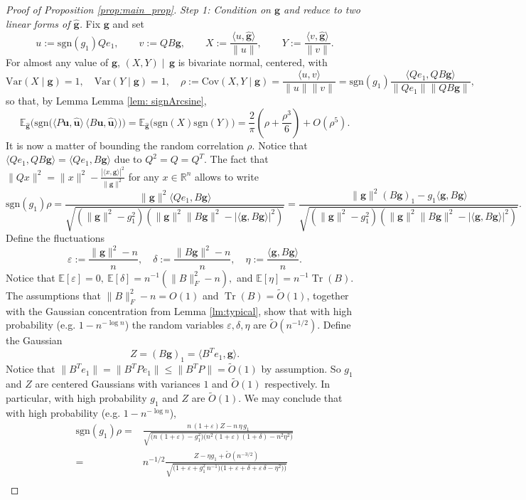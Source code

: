 \documentclass[reqno]{amsart}
\numberwithin{equation}{section}
\newcommand\E{\mathbb{E}}
\newcommand\R{\mathbb{R}}
\newcommand\bg{\bm{g}}
\newcommand\hg{\hat{\bm g}}
\newcommand\rem{\tilde{O}\left(n^{-3/2}\right)}
\newcommand\bu{\bm{u}}
\newcommand\hu{\hat{\bm u}}
\newcommand\eps{\varepsilon}
\newcommand\Tr{{\operatorname{Tr}}}
\newcommand{\Var}{\mathrm{Var}}
\newcommand{\Cov}{\mathrm{Cov}}
\begin{document}
\begin{proof}[Proof of Proposition \ref{prop:main_prop}]
\emph{Step 1: Condition on $\bg$ and reduce to two linear forms of $\hg$.}
Fix $\bg$ and set
\[
u:=\mathrm{sgn}(g_1)Qe_1,\qquad v:=QB\bg, \qquad
X:=\frac{\langle u,\hg\rangle}{\|u\|},\qquad
Y:=\frac{\langle v,\hg\rangle}{\|v\|}.
\]
For almost any value of $\bg$, $(X,Y)\mid\,\bg$ is bivariate normal, centered, with
\[
\Var(X\mid \bg)=1,\quad \Var(Y\mid \bg)=1,\quad
\rho:=\Cov(X,Y\mid \bg)=\frac{\langle u,v\rangle}{\|u\|\|v\|}=\mathrm{sgn}(g_1)\frac{\langle Qe_1,QB\bg\rangle}{\|Qe_1\|\|QB\bg\|},
\]
so that, by Lemma Lemma \ref{lem: signArcsine},
\[\E_{\hg}\big(\mathrm{sgn}\!\big(\langle P\bu,\hu\rangle\,\langle B\bu,\hu\rangle\big)\big)=\E_{\hg}\big(\mathrm{sgn}(X)\mathrm{sgn}(Y)\big)=\frac{2}{\pi}\left(\rho+\frac{\rho^3}{6}\right)+O(\rho^5).\]
It is now a matter of bounding the random correlation \(\rho\). Notice that $\langle Qe_1,QB\bg\rangle=\langle Qe_1,B\bg\rangle$ due to $Q^2=Q=Q^T$. The fact that $\|Qx\|^2=\|x\|^2-\frac{|\langle x,\bg\rangle|^2}{\|\bg\|^2}$ for any $x\in\R^n$ allows to write
\[
\mathrm{sgn}(g_{1})\rho
=\frac{\|\bg\|^2\langle Qe_1,B\bg\rangle}{\sqrt{(\|\bg\|^2-g_{1}^2)(\|\bg\|^2\|B\bg\|^2-|\langle \bg,B\bg\rangle|^2)}}
=\frac{\|\bg\|^2(B\bg)_1-g_{1}\langle \bg,B\bg\rangle}{\sqrt{(\|\bg\|^2-g_{1}^2)(\|\bg\|^2\|B\bg\|^2-|\langle \bg,B\bg\rangle|^2)}}.
\]
Define the fluctuations 
\begin{equation} \label{eq:errors}
   \eps:=\frac{\|\bg\|^2-n}{n},\quad \delta:=\frac{\|B\bg\|^2-n}{n},\quad \eta:=\frac{\langle\bg,B\bg\rangle}{n}.
\end{equation}
Notice that $\E[\eps]=0,\ \E[\delta]=n^{-1}(\|B\|_{F}^2-n),$ and $\E[\eta]=n^{-1}\Tr(B)$. The assumptions that $\|B\|_{F}^2-n=O(1)$ and $\Tr(B)=\tilde{O}(1)$, together with the Gaussian concentration from Lemma \ref{lm:typical}, show that with high probability (e.g. $1-n^{-\log n}$) the random variables $\eps,\delta,\eta$ are $\tilde{O}(n^{-1/2})$. Define the Gaussian 
\[Z=(B\bg)_1=\langle B^Te_1,\bg\rangle.\]
Notice that $\|B^Te_1\|=\|B^TPe_1\|\le\|B^TP\|=\tilde{O}(1)$ by assumption. So $g_1$ and $Z$ are centered Gaussians with variances $1$ and $\tilde{O}(1)$ respectively. In particular, with high probability $g_1$ and $Z$ are $\tilde{O}(1)$. We may conclude that with high probability (e.g. $1-n^{-\log n}$),
\begin{align*}
\mathrm{sgn}(g_{1})\rho=& \frac{n\,(1+\eps)Z-n\,\eta\, g_1}{\sqrt{\big(n\,(1+\eps)-g_1^2\big)\big(n^2(1+\eps)(1+\delta)-n^2\eta^2\big)}}\\
= &    n^{-1/2}\frac{Z-\eta g_1+\rem}{\sqrt{\big(1+\eps+g_{1}^2\,n^{-1}\big)\big(1+\eps+\delta+\eps\,\delta-\eta^2)\big)}}\\

\end{align*}
\end{proof}
\end{document}
